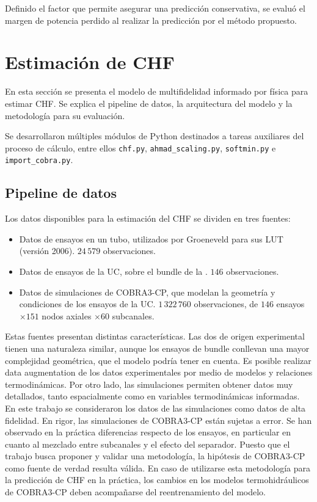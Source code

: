 Definido el factor que permite asegurar una predicción conservativa, se evaluó el margen de potencia perdido al realizar la predicción por el método propuesto. 

\section{Estimación de CHF}
En esta sección se presenta el modelo de multifidelidad informado por física para estimar CHF. Se explica el pipeline de datos, la arquitectura del modelo y la metodología para su evaluación.

Se desarrollaron múltiples módulos de Python destinados a tareas auxiliares del proceso de cálculo, entre ellos \texttt{chf.py}, \texttt{ahmad\_scaling.py}, \texttt{softmin.py} e \texttt{import\allowbreak\_cobra.py}. 

\subsection{Pipeline de datos}
\label{sec:chf_pipeline}
Los datos disponibles para la estimación del CHF se dividen en tres fuentes:
\begin{itemize}
    \item Datos de ensayos en un tubo, utilizados por Groeneveld para sus LUT (versión 2006). $24\,579$ observaciones.
    \item Datos de ensayos de la UC, sobre el bundle de la \cna{}. $146$ observaciones.
    \item Datos de simulaciones de COBRA3-CP, que modelan la geometría y condiciones de los ensayos de la UC. $1\,322\,760$ observaciones, de $146$ ensayos $\times 151$ nodos axiales $\times 60$ subcanales.
\end{itemize}
Estas fuentes presentan distintas características. Las dos de origen experimental tienen una naturaleza similar, aunque los ensayos de bundle conllevan una mayor complejidad geométrica, que el modelo podría tener en cuenta. Es posible realizar data augmentation de los datos experimentales por medio de modelos y relaciones termodinámicas. Por otro lado, las simulaciones permiten obtener datos muy detallados, tanto espacialmente como en variables termodinámicas informadas. En este trabajo se consideraron los datos de las simulaciones como datos de alta fidelidad. En rigor, las simulaciones de COBRA3-CP están sujetas a error. Se han observado en la práctica diferencias respecto de los ensayos, en particular en cuanto al mezclado entre subcanales y el efecto del separador. Puesto que el trabajo busca proponer y validar una metodología, la hipótesis de COBRA3-CP como fuente de verdad resulta válida. En caso de utilizarse esta metodología para la predicción de CHF en la práctica, los cambios en los modelos termohidráulicos de COBRA3-CP deben acompañarse del reentrenamiento del modelo.

